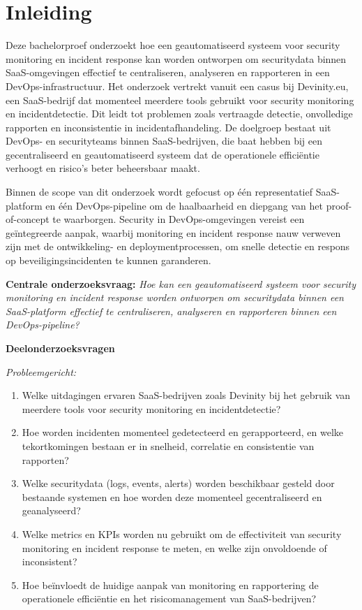 \section{Inleiding}%
\label{sec:inleiding}
Deze bachelorproef onderzoekt hoe een geautomatiseerd systeem voor security monitoring en incident response kan worden ontworpen om securitydata binnen SaaS-omgevingen effectief te 
centraliseren, analyseren en rapporteren in een DevOps-infrastructuur. Het onderzoek vertrekt vanuit een casus bij Devinity.eu, een SaaS-bedrijf dat momenteel meerdere tools gebruikt voor 
security monitoring en incidentdetectie. Dit leidt tot problemen zoals vertraagde detectie, onvolledige rapporten en inconsistentie in incidentafhandeling. De doelgroep bestaat uit 
DevOps- en securityteams binnen SaaS-bedrijven, die baat hebben bij een gecentraliseerd en geautomatiseerd systeem dat de operationele efficiëntie verhoogt en risico’s beter beheersbaar maakt. 

Binnen de scope van dit onderzoek wordt gefocust op één representatief SaaS-platform en één DevOps-pipeline om de haalbaarheid en diepgang van het proof-of-concept te waarborgen. Security in DevOps-omgevingen vereist een geïntegreerde aanpak, waarbij monitoring en incident response nauw verweven zijn met de ontwikkeling- en deploymentprocessen, om snelle detectie en respons op beveiligingsincidenten te kunnen garanderen.

\textbf{Centrale onderzoeksvraag:}  
\textit{Hoe kan een geautomatiseerd systeem voor security monitoring en incident response worden ontworpen om securitydata binnen een SaaS-platform effectief te centraliseren, analyseren en rapporteren binnen een DevOps-pipeline?}

\textbf{Deelonderzoeksvragen}

\emph{Probleemgericht:}
\begin{enumerate}
    \item Welke uitdagingen ervaren SaaS-bedrijven zoals Devinity bij het gebruik van meerdere tools voor security monitoring en incidentdetectie?
    \item Hoe worden incidenten momenteel gedetecteerd en gerapporteerd, en welke tekortkomingen bestaan er in snelheid, correlatie en consistentie van rapporten?
    \item Welke securitydata (logs, events, alerts) worden beschikbaar gesteld door bestaande systemen en hoe worden deze momenteel gecentraliseerd en geanalyseerd?
    \item Welke metrics en KPIs worden nu gebruikt om de effectiviteit van security monitoring en incident response te meten, en welke zijn onvoldoende of inconsistent?
    \item Hoe beïnvloedt de huidige aanpak van monitoring en rapportering de operationele efficiëntie en het risicomanagement van SaaS-bedrijven?
\end{enumerate}

